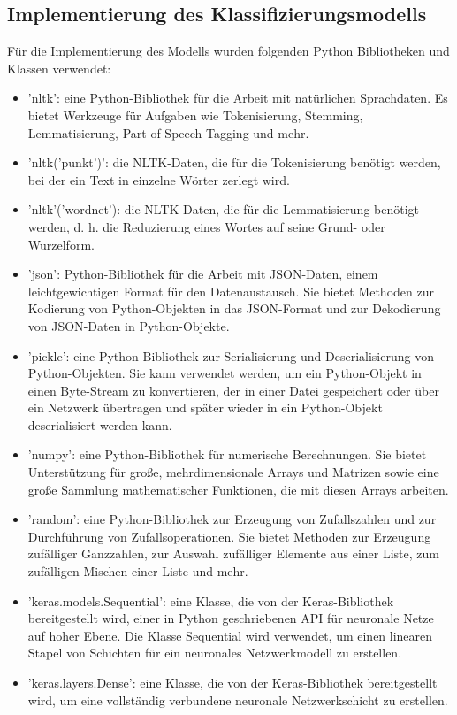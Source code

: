 \subsection{Implementierung des Klassifizierungsmodells}
Für die Implementierung des Modells wurden folgenden Python Bibliotheken und Klassen verwendet:
\begin{itemize}
    \item 'nltk': eine Python-Bibliothek für die Arbeit mit natürlichen Sprachdaten. Es bietet Werkzeuge für Aufgaben wie Tokenisierung, Stemming, Lemmatisierung, Part-of-Speech-Tagging und mehr.
    \item 'nltk('punkt')': die \ac{NLTK}-Daten, die für die Tokenisierung benötigt werden, bei der ein Text in einzelne Wörter zerlegt wird.
    \item 'nltk'('wordnet'): die \ac{NLTK}-Daten, die für die Lemmatisierung benötigt werden, d. h. die Reduzierung eines Wortes auf seine Grund- oder Wurzelform.
    \item 'json': Python-Bibliothek für die Arbeit mit \ac{JSON}-Daten, einem leichtgewichtigen Format für den Datenaustausch. Sie bietet Methoden zur Kodierung von Python-Objekten in das \ac{JSON}-Format und zur Dekodierung von \ac{JSON}-Daten in Python-Objekte.
    \item 'pickle': eine Python-Bibliothek zur Serialisierung und Deserialisierung von Python-Objekten. Sie kann verwendet werden, um ein Python-Objekt in einen Byte-Stream zu konvertieren, der in einer Datei gespeichert oder über ein Netzwerk übertragen und später wieder in ein Python-Objekt deserialisiert werden kann.
    \item 'numpy': eine Python-Bibliothek für numerische Berechnungen. Sie bietet Unterstützung für große, mehrdimensionale Arrays und Matrizen sowie eine große Sammlung mathematischer Funktionen, die mit diesen Arrays arbeiten.
    \item 'random': eine Python-Bibliothek zur Erzeugung von Zufallszahlen und zur Durchführung von Zufallsoperationen. Sie bietet Methoden zur Erzeugung zufälliger Ganzzahlen, zur Auswahl zufälliger Elemente aus einer Liste, zum zufälligen Mischen einer Liste und mehr.
    \item 'keras.models.Sequential': eine Klasse, die von der Keras-Bibliothek bereitgestellt wird, einer in Python geschriebenen \ac{API} für neuronale Netze auf hoher Ebene. Die Klasse Sequential wird verwendet, um einen linearen Stapel von Schichten für ein neuronales Netzwerkmodell zu erstellen.
    \item 'keras.layers.Dense': eine Klasse, die von der Keras-Bibliothek bereitgestellt wird, um eine vollständig verbundene neuronale Netzwerkschicht zu erstellen.

\end{itemize}
